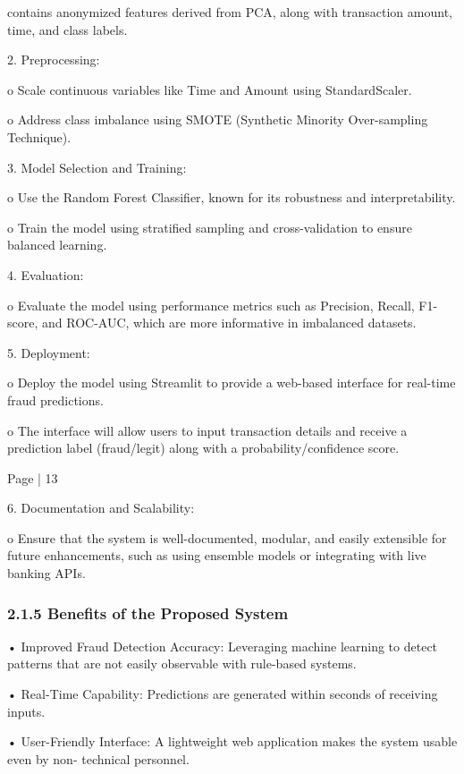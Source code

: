 \documentclass[11pt,a4paper]{article}
\begin{document}
contains anonymized features derived from PCA, along with transaction amount, time, and class 
labels. 

2. Preprocessing: 

\begin{center}
o 
Scale continuous variables like Time and Amount using StandardScaler. 
\end{center}

o 
Address class imbalance using SMOTE (Synthetic Minority Over-sampling Technique). 

3. Model Selection and Training: 

o 
Use the Random Forest Classifier, known for its robustness and interpretability. 

o 
Train the model using stratified sampling and cross-validation to ensure balanced learning. 

4. Evaluation: 

o 
Evaluate the model using performance metrics such as Precision, Recall, F1-score, and 
ROC-AUC, which are more informative in imbalanced datasets. 

5. Deployment: 

o 
Deploy the model using Streamlit to provide a web-based interface for real-time fraud 
predictions. 

o 
The interface will allow users to input transaction details and receive a prediction label 
(fraud/legit) along with a probability/confidence score. 

Page | 13  

\newpage

6. Documentation and Scalability: 

o 
Ensure that the system is well-documented, modular, and easily extensible for future 
enhancements, such as using ensemble models or integrating with live banking APIs. 

\subsubsection*{2.1.5 Benefits of the Proposed System }

• 
Improved Fraud Detection Accuracy: Leveraging machine learning to detect patterns that are not 
easily observable with rule-based systems. 

• 
Real-Time Capability: Predictions are generated within seconds of receiving inputs. 

• 
User-Friendly Interface: A lightweight web application makes the system usable even by non-
technical personnel. 
\end{document}
